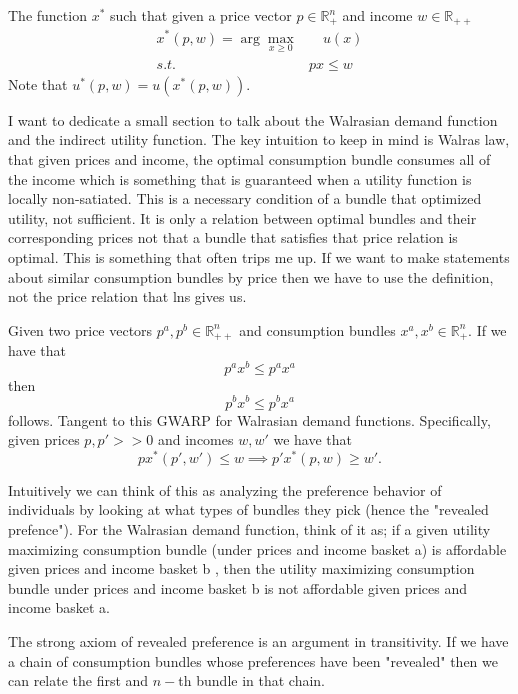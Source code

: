 \documentclass[11pt,english]{article}
\begin{document}
\begin{definition}
The function $x^*$ such that given a price vector $p \in \mathbb{R}_+^n$ and income $w \in \mathbb{R}_{++}$ \begin{align*}
x^*(p,w) = \arg\max_{x \geq 0} & \quad u(x)\\
s.t. \quad & px \leq w
\end{align*} Note that $u^*(p,w) = u(x^*(p,w))$.
\end{definition}

I want to dedicate a small section to talk about the Walrasian demand function and the indirect utility function. The key intuition to keep in mind is Walras law, that given prices and income, the optimal consumption bundle consumes all of the income which is something that is guaranteed when a utility function is locally non-satiated. This is a necessary condition of a bundle that optimized utility, not sufficient. It is only a relation between optimal bundles and their corresponding prices not that a bundle that satisfies that price relation is optimal. This is something that often trips me up. If we want to make statements about similar consumption bundles by price then we have to use the definition, not the price relation that lns gives us.

\begin{theorem}
Given two price vectors $p^a, p^b \in \mathbb{R}_{++}^n$ and consumption bundles $x^a, x^b \in \mathbb{R}_+^n$. If we have that $$p^ax^b \leq p^a x^a$$ then $$p^b x^b \leq p^b x^a$$ follows. Tangent to this GWARP for Walrasian demand functions. Specifically, given prices $p, p' >> 0$ and incomes $w, w'$ we have that $$px^*(p',w') \leq w \implies p'x^*(p,w) \geq w'.$$
\end{theorem} Intuitively we can think of this as analyzing the preference behavior of individuals by looking at what types of bundles they pick (hence the "revealed prefence"). For the Walrasian demand function, think of it as; if a given utility maximizing consumption bundle (under prices and income basket a) is affordable given prices and income basket b , then the utility maximizing consumption bundle under prices and income basket b is not affordable given prices and income basket a. 

The strong axiom of revealed preference is an argument in transitivity. If we have a chain of consumption bundles whose preferences have been "revealed" then we can relate the first and $n-$th bundle in that chain.
\end{document}
